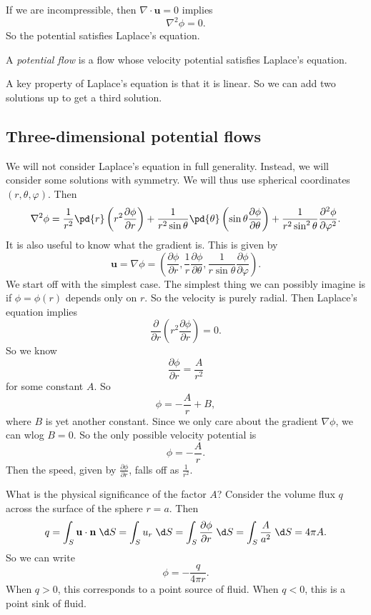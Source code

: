\documentclass[a4paper]{article}
\begin{document}
If we are incompressible, then $\nabla \cdot \mathbf{u} = 0$ implies
\[
  \nabla^2 \phi = 0.
\]
So the potential satisfies Laplace's equation.

\begin{defi}
  A \emph{potential flow} is a flow whose velocity potential satisfies Laplace's equation.
\end{defi}

A key property of Laplace's equation is that it is linear. So we can add two solutions up to get a third solution.

\subsection{Three-dimensional potential flows}
We will not consider Laplace's equation in full generality. Instead, we will consider some solutions with symmetry. We will thus use spherical coordinates $(r, \theta, \varphi)$. Then
\[
  \nabla^2 \phi = \frac{1}{r^2} \pd{r} \left(r^2 \frac{\partial \phi}{\partial r}\right) + \frac{1}{r^2 \sin \theta} \pd{\theta} \left(\sin \theta\frac{\partial \phi}{\partial \theta}\right) + \frac{1}{r^2 \sin^2 \theta} \frac{\partial^2 \phi}{\partial \varphi^2}.
\]
It is also useful to know what the gradient is. This is given by
\[
  \mathbf{u} = \nabla \phi = \left(\frac{\partial \phi}{\partial r}, \frac{1}{r} \frac{\partial \phi}{\partial \theta}, \frac{1}{r \sin \theta} \frac{\partial \phi}{\partial \varphi}\right).
\]
We start off with the simplest case. The simplest thing we can possibly imagine is if $\phi = \phi(r)$ depends only on $r$. So the velocity is purely radial. Then Laplace's equation implies
\[
  \frac{\partial}{\partial r}\left(r^2 \frac{\partial \phi}{\partial r}\right) = 0.
\]
So we know
\[
  \frac{\partial \phi}{\partial r} = \frac{A}{r^2}
\]
for some constant $A$. So
\[
  \phi = -\frac{A}{r} + B,
\]
where $B$ is yet another constant. Since we only care about the gradient $\nabla \phi$, we can wlog $B = 0$. So the only possible velocity potential is
\[
  \phi = -\frac{A}{r}.
\]
Then the speed, given by $\frac{\partial \phi}{\partial r}$, falls off as $\frac{1}{r^2}$.

What is the physical significance of the factor $A$? Consider the volume flux $q$ across the surface of the sphere $r = a$. Then
\[
  q = \int_S \mathbf{u}\cdot \mathbf{n} \;\d S = \int_S u_r \;\d S = \int_S \frac{\partial \phi}{\partial r} \;\d S = \int_S \frac{A}{a^2}\;\d S = 4\pi A.
\]
So we can write
\[
  \phi = -\frac{q}{4\pi r}.
\]
When $q > 0$, this corresponds to a point source of fluid. When $q < 0$, this is a point sink of fluid.
\end{document}
